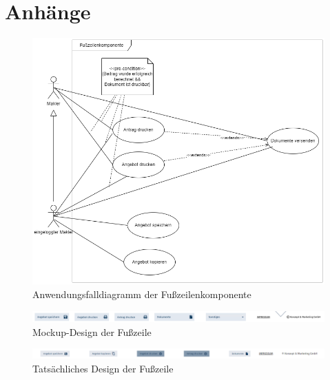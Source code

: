 \appendix

\section{Anhänge}

\begin{figure}[h]
	\includegraphics[width=\textwidth, height=\textheight, keepaspectratio]{anhang/usecase_footer.png}
	\caption{Anwendungsfalldiagramm der Fußzeilenkomponente}
	\label{usecasefooter}
\end{figure}
\begin{figure}[h]
	\includegraphics[width=\textwidth, height=\textheight, keepaspectratio]{anhang/mockup_footer.png}
	\caption{Mockup-Design der Fußzeile}
	\label{mockup}
\end{figure}
\begin{figure}[t]
	\includegraphics[width=\textwidth, height=\textheight, keepaspectratio]{anhang/actual_footer.png}
	\caption{Tatsächliches Design der Fußzeile}
	\label{actualfooter}
\end{figure}